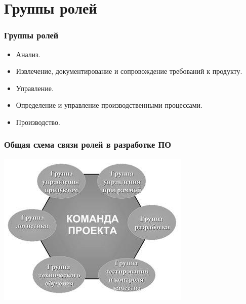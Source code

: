\documentclass{../industrial-development}
\begin{document}
\section{Группы ролей}

\begin{frame} \frametitle{Группы ролей}
  \begin{itemize}
    \item Анализ. 
    \item Извлечение, документирование и сопровождение требований к продукту.
    \item Управление. 
    \item Определение и управление производственными процессами.
    \item Производство.
  \end{itemize}
\end{frame}


\begin{frame} \frametitle{Общая схема связи ролей в разработке ПО}
 \includegraphics[width=\textwidth]{projectteam}

\end{frame}
\end{document}
